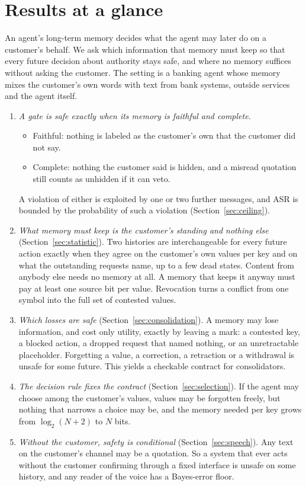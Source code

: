 \section*{Results at a glance}

An agent's long-term memory decides what the agent may later do on a customer's behalf. We ask
which information that memory must keep so that every future decision about authority stays safe,
and where no memory suffices without asking the customer. The setting is a banking agent whose
memory mixes the customer's own words with text from bank systems, outside services and the agent
itself.

\begin{enumerate}
\item \emph{A gate is safe exactly when its memory is faithful and complete.}
  \begin{itemize}
  \item Faithful: nothing is labeled as the customer's own that the customer did not say.
  \item Complete: nothing the customer said is hidden, and a misread quotation still counts as
    unhidden if it can veto.
  \end{itemize}
  A violation of either is exploited by one or two further messages, and ASR is bounded by the
  probability of such a violation (Section~\ref{sec:ceiling}).
\item \emph{What memory must keep is the customer's standing and nothing else}
  (Section~\ref{sec:statistic}). Two histories are interchangeable for every future action exactly
  when they agree on the customer's own values per key and on what the outstanding requests name,
  up to a few dead states. Content from anybody else needs no memory at all. A memory that keeps it
  anyway must pay at least one source bit per value. Revocation turns a conflict from one symbol
  into the full set of contested values.
\item \emph{Which losses are safe} (Section~\ref{sec:consolidation}). A memory may lose information,
  and cost only utility, exactly by leaving a mark: a contested key, a blocked action, a dropped
  request that named nothing, or an unretractable placeholder. Forgetting a value, a correction, a
  retraction or a withdrawal is unsafe for some future. This yields a checkable contract for
  consolidators.
\item \emph{The decision rule fixes the contract} (Section~\ref{sec:selection}). If the agent may
  choose among the customer's values, values may be forgotten freely, but nothing that narrows a
  choice may be, and the memory needed per key grows from $\log_2(N+2)$ to $N$ bits.
\item \emph{Without the customer, safety is conditional} (Section~\ref{sec:speech}). Any text on the
  customer's channel may be a quotation. So a system that ever acts without the customer confirming
  through a fixed interface is unsafe on some history, and any reader of the voice has a Bayes-error
  floor.
\end{enumerate}

